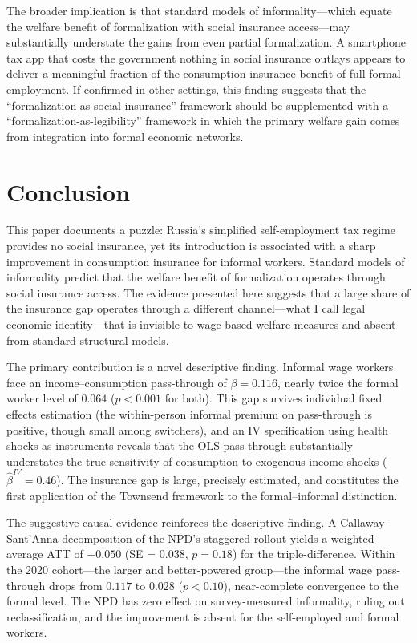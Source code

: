 \documentclass[12pt]{article}
\begin{document}
The broader implication is that standard models of informality---which equate the welfare benefit of formalization with social insurance access---may substantially understate the gains from even partial formalization. A smartphone tax app that costs the government nothing in social insurance outlays appears to deliver a meaningful fraction of the consumption insurance benefit of full formal employment. If confirmed in other settings, this finding suggests that the ``formalization-as-social-insurance'' framework should be supplemented with a ``formalization-as-legibility'' framework in which the primary welfare gain comes from integration into formal economic networks.


\section{Conclusion}
\label{sec:conclusion}

This paper documents a puzzle: Russia's simplified self-employment tax regime provides no social insurance, yet its introduction is associated with a sharp improvement in consumption insurance for informal workers. Standard models of informality predict that the welfare benefit of formalization operates through social insurance access. The evidence presented here suggests that a large share of the insurance gap operates through a different channel---what I call legal economic identity---that is invisible to wage-based welfare measures and absent from standard structural models.

The primary contribution is a novel descriptive finding. Informal wage workers face an income--consumption pass-through of $\beta = 0.116$, nearly twice the formal worker level of $0.064$ ($p < 0.001$ for both). This gap survives individual fixed effects estimation (the within-person informal premium on pass-through is positive, though small among switchers), and an IV specification using health shocks as instruments reveals that the OLS pass-through substantially understates the true sensitivity of consumption to exogenous income shocks ($\hat{\beta}^{IV} = 0.46$). The insurance gap is large, precisely estimated, and constitutes the first application of the Townsend framework to the formal--informal distinction.

The suggestive causal evidence reinforces the descriptive finding. A Callaway-Sant'Anna decomposition of the NPD's staggered rollout yields a weighted average ATT of $-0.050$ (SE = 0.038, $p = 0.18$) for the triple-difference. Within the 2020 cohort---the larger and better-powered group---the informal wage pass-through drops from $0.117$ to $0.028$ ($p < 0.10$), near-complete convergence to the formal level. The NPD has zero effect on survey-measured informality, ruling out reclassification, and the improvement is absent for the self-employed and formal workers.
\end{document}
